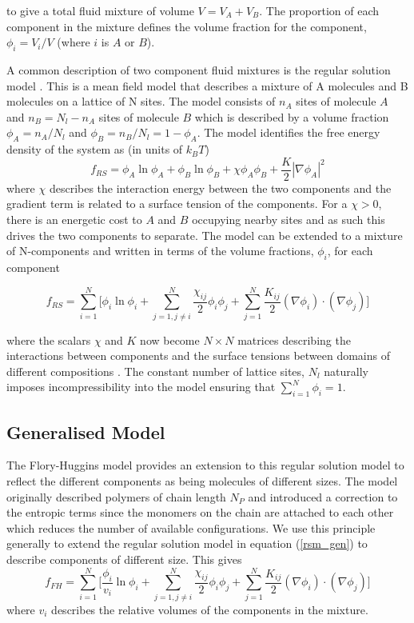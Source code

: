 to give a total fluid mixture of volume $V=V_A + V_B$. The proportion of each component in the mixture defines the volume fraction for the component, $\phi_i = V_i/V$ (where $i$ is $A$ or $B$).

A common description of two component fluid mixtures is the regular solution model \cite{jones2002soft}. This is a mean field model that describes a mixture of A molecules and B molecules on a lattice of N sites. The model consists of $n_A$ sites of molecule $A$ and $n_B=N_l-n_A$ sites of molecule $B$ which is described by a volume fraction $\phi_A = n_A/N_l$ and $\phi_B = n_B/N_l = 1-\phi_A$. The model identifies the free energy density of the system as (in units of $k_BT$)
\begin{equation}
    f_{RS} = \phi_A\ln\phi_A+\phi_B\ln\phi_B + \chi\phi_A\phi_B + \frac{K}{2}|\nabla\phi_A|^2
\end{equation}
where $\chi$ describes the interaction energy between the two components and the gradient term is related to a surface tension of the components. For a $\chi > 0$, there is an energetic cost to $A$ and $B$ occupying nearby sites and as such this drives the two components to separate. The model can be extended to a mixture of N-components and written in terms of the volume fractions, $\phi_i$, for each component

\begin{equation}
    f_{RS} = \sum_{i=1}^{N}\Bigg[\phi_i\ln\phi_i+\sum_{j=1, j\neq i}^{N}\frac{\chi_{ij}}{2}\phi_i\phi_j + \sum_{j=1}^{N} \frac{K_{ij}}{2}(\nabla\phi_i)\cdot(\nabla\phi_j)\Bigg]
    \label{rsm_gen}
\end{equation}

where the scalars $\chi$ and $K$ now become $N \times N$ matrices describing the interactions between components and the surface tensions between domains of different compositions \cite{berry_physical_2018}. The constant number of lattice sites, $N_l$ naturally imposes incompressibility into the model ensuring that $\sum_{i=1}^N\phi_i=1$.

\subsection{\label{sec:multi_fh}Generalised Model}
The Flory-Huggins model provides an extension to this regular solution model to reflect the different components as being molecules of different sizes. The model originally described polymers of chain length $N_P$ and introduced a correction to the entropic terms since the monomers on the chain are attached to each other which reduces the number of available configurations. We use this principle generally to extend the regular solution model in equation (\ref{rsm_gen}) to describe components of different size. This gives
\begin{equation}
    f_{FH} = \sum_{i=1}^{N}\Bigg[\frac{\phi_i}{v_i}\ln\phi_i+\sum_{j=1, j\neq i}^{N}\frac{\chi_{ij}}{2}\phi_i\phi_j + \sum_{j=1}^{N} \frac{K_{ij}}{2}(\nabla\phi_i)\cdot(\nabla\phi_j)\Bigg]
    \label{fh_gen}
\end{equation}
where $v_i$ describes the relative volumes of the components in the mixture. 


